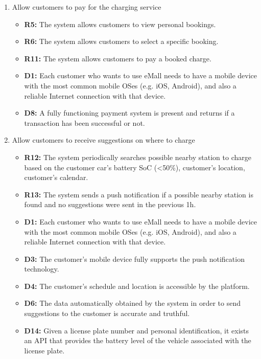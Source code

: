 \begin{enumerate}[label=\textbf{-G\arabic*}:]
{          }
    \item {Allow customers to pay for the charging service
          \begin{itemize}
              \item \textbf{R5:} The system allows customers to view personal bookings.
              \item \textbf{R6:} The system allows customers to select a specific booking.
              \item \textbf{R11:} The system allows customers to pay a booked charge.
              \item \textbf{D1:} Each customer who wants to use eMall needs to have a mobile device with the most common mobile OSes (e.g. iOS, Android), and also a reliable Internet connection with that device.
              \item \textbf{D8:} A fully functioning payment system is present and returns if a transaction has been successful or not.
              
          \end{itemize}
          }
    
          \item {Allow customers to receive suggestions on where to charge
          \begin{itemize}
              \item \textbf{R12:} The system periodically searches possible nearby station to charge based on the customer car's battery SoC (<50\%), customer's location, customer's calendar.
              \item \textbf{R13:} The system sends a push notification if a possible nearby station is found and no suggestions were sent in the previous 1h.
              \item \textbf{D1:} Each customer who wants to use eMall needs to have a mobile device with the most common mobile OSes (e.g. iOS, Android), and also a reliable Internet connection with that device.
              \item \textbf{D3:} The customer's mobile device fully supports the push notification technology.
              \item \textbf{D4:} The customer's schedule and location is accessible by the platform.
              \item \textbf{D6:} The data automatically obtained by the system in order to send suggestions to the customer is accurate and truthful.
              \item \textbf{D14:} Given a license plate number and personal identification, it exists an API that provides the battery level of the vehicle associated with the license plate.
              

\end{itemize}}
\end{enumerate}
